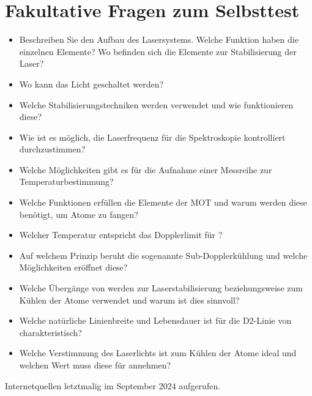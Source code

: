 \documentclass[
class=book,
accentcolor=1b,
custommargins=geometry,
fontsize=11pt,
thesis={type=Versuchsanleitung},
ruledheaders=all,
headline=false,
instbox=false,
marginpar=false,
title=small,
ignore-missing-data=true,
twoside=false,
logofile=apqdesign/tuda_logo.pdf,
pdfa=false %
]{apqpub}
\begin{document}
					\section{Fakultative Fragen zum Selbsttest}
					\begin{itemize}
						\item Beschreiben Sie den Aufbau des Lasersystems. Welche Funktion haben die einzelnen Elemente? Wo befinden sich die Elemente zur Stabilisierung der Laser? 
						\item Wo kann das Licht geschaltet werden?				
						\item Welche Stabilisierungstechniken werden verwendet und wie funktionieren diese?
						\item Wie ist es möglich, die Laserfrequenz für die Spektroskopie kontrolliert durchzustimmen?
						\item Welche Möglichkeiten gibt es für die Aufnahme einer Messreihe zur Temperaturbestimmung?
						\item Welche Funktionen erfüllen die Elemente der MOT und warum werden diese benötigt, um Atome zu fangen?
						\item Welcher Temperatur entspricht das Dopplerlimit für ?
						\item Auf welchem Prinzip beruht die sogenannte Sub-Dopplerkühlung und welche Möglichkeiten eröffnet diese?
						\item Welche Übergänge von  werden zur Laserstabilisierung beziehungsweise zum Kühlen der Atome verwendet und warum ist dies sinnvoll?
						\item Welche natürliche Linienbreite und Lebensdauer ist für die D2-Linie von  charakteristisch?
						\item Welche Verstimmung des Laserlichts ist zum Kühlen der Atome ideal und welchen Wert muss diese für  annehmen?
					\end{itemize}
\newpage
\appendix	
\printbibliography
Internetquellen letztmalig im September 2024 aufgerufen.		
					
								
\end{document}
